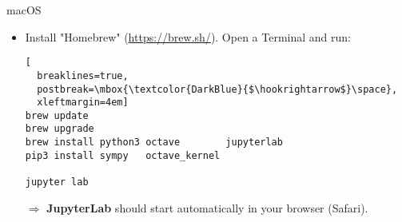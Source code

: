 \begin{frame}[fragile]{macOS}
\begin{itemize}
\itemsep2em
\item
Install "Homebrew" (\url{https://brew.sh/}).
Open a Terminal and run:
\begin{lstlisting}[
  breaklines=true,
  postbreak=\mbox{\textcolor{DarkBlue}{$\hookrightarrow$}\space},
  xleftmargin=4em]
brew update
brew upgrade
brew install python3 octave        jupyterlab
pip3 install sympy   octave_kernel

jupyter lab
\end{lstlisting}
$\Rightarrow$ \textbf{JupyterLab} should start automatically
in your browser (Safari).
\end{itemize}
\vfill
\end{frame}
